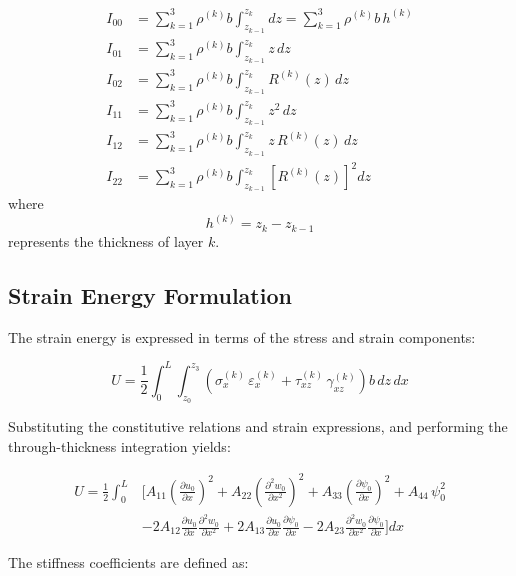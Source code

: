 \documentclass[12pt,a4paper]{report}
\begin{document}
\begin{align}
I_{00} &= \sum_{k=1}^{3} \rho^{(k)} b \int_{z_{k-1}}^{z_k} dz 
       = \sum_{k=1}^{3} \rho^{(k)} b \, h^{(k)} \\[6pt]
I_{01} &= \sum_{k=1}^{3} \rho^{(k)} b \int_{z_{k-1}}^{z_k} z \, dz \\[6pt]
I_{02} &= \sum_{k=1}^{3} \rho^{(k)} b \int_{z_{k-1}}^{z_k} R^{(k)}(z) \, dz \\[6pt]
I_{11} &= \sum_{k=1}^{3} \rho^{(k)} b \int_{z_{k-1}}^{z_k} z^2 \, dz \\[6pt]
I_{12} &= \sum_{k=1}^{3} \rho^{(k)} b \int_{z_{k-1}}^{z_k} z \, R^{(k)}(z) \, dz \\[6pt]
I_{22} &= \sum_{k=1}^{3} \rho^{(k)} b \int_{z_{k-1}}^{z_k} \left[ R^{(k)}(z) \right]^2 dz
\end{align}
where 
\begin{equation}
h^{(k)} = z_k - z_{k-1}
\end{equation}
represents the thickness of layer $k$.

\subsection*{Strain Energy Formulation}

The strain energy is expressed in terms of the stress and strain components:

\begin{equation}
U = \frac{1}{2} \int_0^L \int_{z_0}^{z_3} 
\left( \sigma_x^{(k)} \, \varepsilon_x^{(k)} 
     + \tau_{xz}^{(k)} \, \gamma_{xz}^{(k)} \right) 
b \, dz \, dx
\end{equation}

Substituting the constitutive relations and strain expressions, and performing the through-thickness integration yields:

\begin{align}
U = \frac{1}{2} \int_0^L &\Bigg[ 
A_{11} \left(\frac{\partial u_0}{\partial x}\right)^2 
+ A_{22} \left(\frac{\partial^2 w_0}{\partial x^2}\right)^2 
+ A_{33} \left(\frac{\partial \psi_0}{\partial x}\right)^2 
+ A_{44} \, \psi_0^2 \nonumber \\[6pt]
&- 2A_{12} \frac{\partial u_0}{\partial x} \frac{\partial^2 w_0}{\partial x^2} 
+ 2A_{13} \frac{\partial u_0}{\partial x} \frac{\partial \psi_0}{\partial x} 
- 2A_{23} \frac{\partial^2 w_0}{\partial x^2} \frac{\partial \psi_0}{\partial x}
\Bigg] dx
\end{align}

The stiffness coefficients are defined as:
\end{document}
